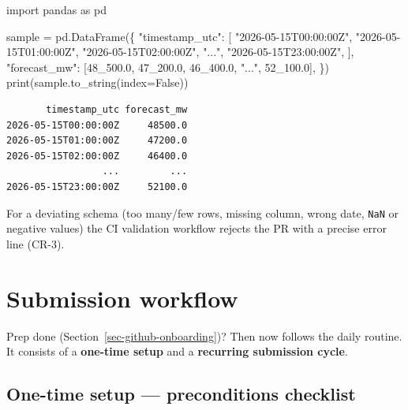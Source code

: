 \documentclass[
  english,
  letterpaper,
]{scrbook}
\newenvironment{Shaded}{\begin{snugshade}}{\end{snugshade}}
\newcommand{\BuiltInTok}[1]{\textcolor[rgb]{0.00,0.23,0.31}{#1}}
\newcommand{\FloatTok}[1]{\textcolor[rgb]{0.68,0.00,0.00}{#1}}
\newcommand{\ImportTok}[1]{\textcolor[rgb]{0.00,0.46,0.62}{#1}}
\newcommand{\NormalTok}[1]{\textcolor[rgb]{0.00,0.23,0.31}{#1}}
\newcommand{\OperatorTok}[1]{\textcolor[rgb]{0.37,0.37,0.37}{#1}}
\newcommand{\StringTok}[1]{\textcolor[rgb]{0.13,0.47,0.30}{#1}}
\newcommand{\VariableTok}[1]{\textcolor[rgb]{0.07,0.07,0.07}{#1}}
\begin{document}
\protect{}\label{sample-csv}
\begin{Shaded}
\begin{Highlighting}[]
\ImportTok{import}\NormalTok{ pandas }\ImportTok{as}\NormalTok{ pd}

\NormalTok{sample }\OperatorTok{=}\NormalTok{ pd.DataFrame(\{}
    \StringTok{"timestamp\_utc"}\NormalTok{: [}
        \StringTok{"2026{-}05{-}15T00:00:00Z"}\NormalTok{,}
        \StringTok{"2026{-}05{-}15T01:00:00Z"}\NormalTok{,}
        \StringTok{"2026{-}05{-}15T02:00:00Z"}\NormalTok{,}
        \StringTok{"..."}\NormalTok{,}
        \StringTok{"2026{-}05{-}15T23:00:00Z"}\NormalTok{,}
\NormalTok{    ],}
    \StringTok{"forecast\_mw"}\NormalTok{: [}\FloatTok{48\_500.0}\NormalTok{, }\FloatTok{47\_200.0}\NormalTok{, }\FloatTok{46\_400.0}\NormalTok{, }\StringTok{"..."}\NormalTok{, }\FloatTok{52\_100.0}\NormalTok{],}
\NormalTok{\})}
\BuiltInTok{print}\NormalTok{(sample.to\_string(index}\OperatorTok{=}\VariableTok{False}\NormalTok{))}
\end{Highlighting}
\end{Shaded}

\begin{verbatim}
       timestamp_utc forecast_mw
2026-05-15T00:00:00Z     48500.0
2026-05-15T01:00:00Z     47200.0
2026-05-15T02:00:00Z     46400.0
                 ...         ...
2026-05-15T23:00:00Z     52100.0
\end{verbatim}

For a deviating schema (too many/few rows, missing column, wrong date,
\texttt{NaN} or negative values) the CI validation workflow rejects the
PR with a precise error line (CR-3).

\section{Submission workflow}\label{sec-submission-workflow}

Prep done (Section~\ref{sec-github-onboarding})? Then now follows the
daily routine. It consists of a \textbf{one-time setup} and a
\textbf{recurring submission cycle}.

\subsection{One-time setup --- preconditions
checklist}\label{one-time-setup-preconditions-checklist}
\end{document}
